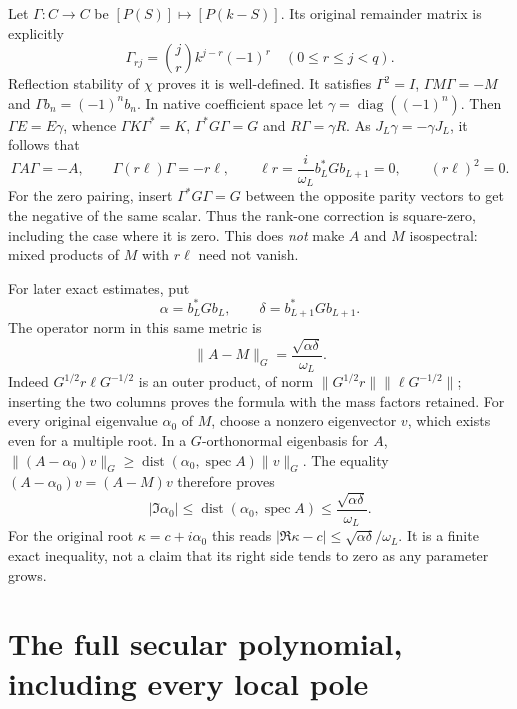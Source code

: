 \documentclass[11pt]{article}
\begin{document}
Let $\Gamma:C\to C$ be $[P(S)]\mapsto[P(k-S)]$.
Its original remainder matrix is explicitly
\begin{equation}\tag{NS7}\label{NS7}
\Gamma_{rj}=\binom jr k^{j-r}(-1)^r\quad(0\leq r\leq j<q).
\end{equation}
Reflection stability of $\chi$ proves it is well-defined.
It satisfies $\Gamma^2=I$, $\Gamma M\Gamma=-M$ and
$\Gamma b_n=(-1)^nb_n$.
In native coefficient space let $\gamma=\operatorname{diag}((-1)^n)$.
Then $\Gamma E=E\gamma$, whence
$\Gamma K\Gamma^*=K$, $\Gamma^*G\Gamma=G$ and
$R\Gamma=\gamma R$. As $J_L\gamma=-\gamma J_L$, it follows that
\begin{equation}\tag{NS8}\label{NS8}
\Gamma A\Gamma=-A,\qquad
\Gamma(r\ell)\Gamma=-r\ell,\qquad
\ell r=\frac{i}{\omega_L}b_L^*Gb_{L+1}=0,\qquad
(r\ell)^2=0 .
\end{equation}
For the zero pairing, insert $\Gamma^*G\Gamma=G$ between the
opposite parity vectors to get the negative of the same scalar.
Thus the rank-one correction is square-zero, including the
case where it is zero. This does \emph{not} make $A$ and $M$
isospectral: mixed products of $M$ with $r\ell$ need not vanish.

For later exact estimates, put
\[
\alpha=b_L^*Gb_L,\qquad \delta=b_{L+1}^*Gb_{L+1}.
\]
The operator norm in this same metric is
\begin{equation}\tag{NS9}\label{NS9}
\|A-M\|_G=\frac{\sqrt{\alpha\delta}}{\omega_L}.
\end{equation}
Indeed $G^{1/2}r\ell G^{-1/2}$ is an outer product, of norm
$\|G^{1/2}r\|\|\ell G^{-1/2}\|$; inserting the two columns
proves the formula with the mass factors retained.
For every original eigenvalue $\alpha_0$ of $M$, choose a
nonzero eigenvector $v$, which exists even for a multiple root.
In a $G$-orthonormal eigenbasis for $A$,
$\|(A-\alpha_0)v\|_G\geq
\operatorname{dist}(\alpha_0,\operatorname{spec}A)\|v\|_G$.
The equality $(A-\alpha_0)v=(A-M)v$ therefore proves
\begin{equation}\tag{NS10}\label{NS10}
|\Im\alpha_0|
\leq\operatorname{dist}(\alpha_0,\operatorname{spec}A)
\leq\frac{\sqrt{\alpha\delta}}{\omega_L}.
\end{equation}
For the original root $\kappa=c+i\alpha_0$ this reads
$|\Re\kappa-c|\leq\sqrt{\alpha\delta}/\omega_L$.
It is a finite exact inequality, not a claim that its right
side tends to zero as any parameter grows.

\section{The full secular polynomial, including every local pole}
\end{document}
